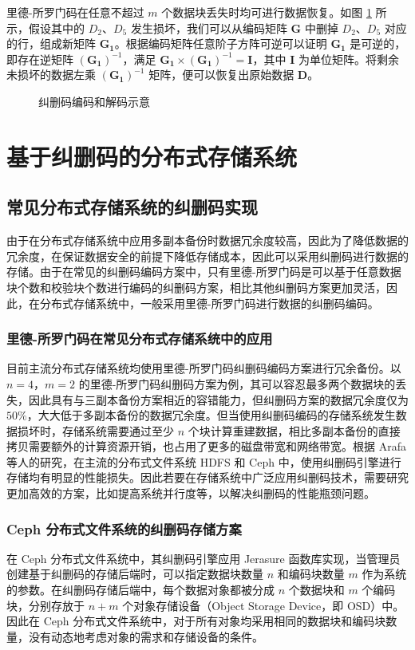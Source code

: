 里德-所罗门码在任意不超过 $m$ 个数据块丢失时均可进行数据恢复。如图 \ref{p1} 所示，假设其中的 $D_2$、$D_5$ 发生损坏，我们可以从编码矩阵 $\boldsymbol{G}$ 中删掉 $D_2$、$D_5$ 对应的行，组成新矩阵 $\boldsymbol{G_1}$。根据编码矩阵任意阶子方阵可逆可以证明 $\boldsymbol{G_1}$ 是可逆的，即存在逆矩阵 $(\boldsymbol{G_1})^{-1}$，满足 $\boldsymbol{G_1}{\times}(\boldsymbol{G_1})^{-1}=\boldsymbol{I}$，其中 $\boldsymbol{I}$ 为单位矩阵。将剩余未损坏的数据左乘 $(\boldsymbol{G_1})^{-1}$ 矩阵，便可以恢复出原始数据 $\boldsymbol{D}$。

\begin{figure}[!htb]
\centering
\resizebox{.8\textwidth}{!}{}
\caption{纠删码编码和解码示意}
\label{p1}
\end{figure}
\section{基于纠删码的分布式存储系统}
\subsection{常见分布式存储系统的纠删码实现}
由于在分布式存储系统中应用多副本备份时数据冗余度较高，因此为了降低数据的冗余度，在保证数据安全的前提下降低存储成本，因此可以采用纠删码进行数据的存储。由于在常见的纠删码编码方案中，只有里德-所罗门码是可以基于任意数据块个数和校验块个数进行编码的纠删码方案，相比其他纠删码方案更加灵活，因此，在分布式存储系统中，一般采用里德-所罗门码进行数据的纠删码编码。
\subsubsection{里德-所罗门码在常见分布式存储系统中的应用}
目前主流分布式存储系统均使用里德-所罗门码纠删码编码方案进行冗余备份。以 $n=4$，$m=2$ 的里德-所罗门码纠删码方案为例，其可以容忍最多两个数据块的丢失，因此具有与三副本备份方案相近的容错能力，但纠删码方案的数据冗余度仅为 $50\%$，大大低于多副本备份的数据冗余度。但当使用纠删码编码的存储系统发生数据损坏时，存储系统需要通过至少 $n$ 个块计算重建数据，相比多副本备份的直接拷贝需要额外的计算资源开销，也占用了更多的磁盘带宽和网络带宽。根据 Arafa 等人\cite{arafa2018evaluating}的研究，在主流的分布式文件系统 HDFS 和 Ceph 中，使用纠删码引擎进行存储均有明显的性能损失。因此若要在存储系统中广泛应用纠删码技术，需要研究更加高效的方案，比如提高系统并行度等，以解决纠删码的性能瓶颈问题。
\subsubsection{Ceph 分布式文件系统的纠删码存储方案}
在 Ceph 分布式文件系统中，其纠删码引擎应用 Jerasure 函数库实现，当管理员创建基于纠删码的存储后端时，可以指定数据块数量 $n$ 和编码块数量 $m$ 作为系统的参数。在纠删码存储后端中，每个数据对象都被分成 $n$ 个数据块和 $m$ 个编码块，分别存放于 $n+m$ 个对象存储设备（Object Storage Device，即 OSD）中。因此在 Ceph 分布式文件系统中，对于所有对象均采用相同的数据块和编码块数量，没有动态地考虑对象的需求和存储设备的条件。
